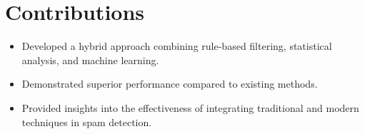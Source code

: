 \documentclass{article}
\begin{document}
\section{Contributions}
\begin{itemize}
    \item Developed a hybrid approach combining rule-based filtering, statistical analysis, and machine learning.
    \item Demonstrated superior performance compared to existing methods.
    \item Provided insights into the effectiveness of integrating traditional and modern techniques in spam detection.
\end{itemize}



\end{document}
